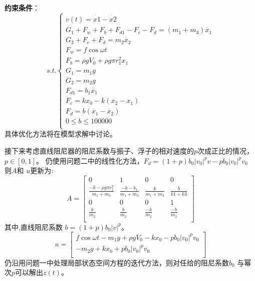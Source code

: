 \documentclass[withoutpreface,bwprint]{cumcmthesis} %
\begin{document}
    \textbf{约束条件}：
    \begin{equation}
        s.t.
        \begin{cases}
            v(t) = \dot{x1} - \dot{x2}\\
            G_1 + F_w + F_b + F_{d1} - F_e - F_d = (m_1 + m_3) \ddot{x_1}\\
            G_2 + F_e + F_d = m_2 \ddot{x_2}\\
            F_w = f \cos\omega t \\
            F_b = \rho g V_0 + \rho g \pi r_1^2 x_1\\
            G_1 = m_1 g\\
            G_2 = m_2 g\\
            F_{d1} = b_1\dot{x_1}\\
            F_e = k x_0 - k(x_2 - x_1)\\
            F_d = b(\dot{x_1} - \dot{x_2})\\
            0 \leq b \leq 100000 \\
        \end{cases}
        \label{eq:control_1}
    \end{equation}
    具体优化方法将在模型求解中讨论。

    接下来考虑直线阻尼器的阻尼系数与振子、浮子的相对速度的$p$次成正比的情况，$p \in[0, 1]$。
    仍使用问题二中的线性化方法，$ F_d = (1 + p) b_0 {\left| v_0 \right|}^p v - p b_0{\left| v_0 \right|}^ p v_0  $
    则$ A $和 $ u $更新为:
    $$
    A = \left [
        \begin{array}{cccc}
            0&1&0&0 \\
            \frac{-k -\rho g \pi r_1^2}{m_1 + m_3} & \frac{-b - b_1}{m_1 + m_3}
            & \frac{k}{m_1 + m_3} & \frac{b}{k1 + k3}\\
            0&0&0&1 \\
            \frac{k}{m_2}& \frac{b}{m_2} & \frac{-k}{m_2} & \frac{-b}{m_2}\\
        \end{array} \right ]
    $$其中,直线阻尼系数 $b = (1+p) b_0 |v|^p$。
    $$
    u = \left [
        \begin{array}{c}
            f\cos \omega t - m_1 g + \rho g V_0 - k x_0 - p b_0 |v_0|^{p}v_0\\
            -m_2 g + k x_0 + p b_0 |v_0|^{p}v_0 \\
        \end{array} \right ]
    $$
    仍沿用问题一中处理局部状态空间方程的迭代方法，则对任给的阻尼系数$ b_0 $ 与幂次$ p $可以解出$ z(t) $。
\end{document}
